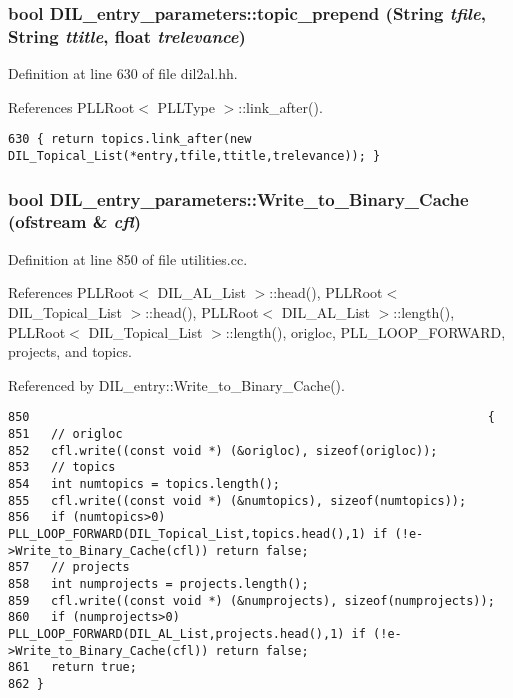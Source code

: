 \subsubsection{\setlength{\rightskip}{0pt plus 5cm}bool DIL\_\-entry\_\-parameters::topic\_\-prepend ({\bf String} {\em tfile}, {\bf String} {\em ttitle}, float {\em trelevance})\hspace{0.3cm}{\tt  [inline]}}\label{classDIL__entry__parameters_a2}




Definition at line 630 of file dil2al.hh.

References PLLRoot$<$ PLLType $>$::link\_\-after().



\footnotesize\begin{verbatim}630 { return topics.link_after(new DIL_Topical_List(*entry,tfile,ttitle,trelevance)); }
\end{verbatim}\normalsize 
{}
\subsubsection{\setlength{\rightskip}{0pt plus 5cm}bool DIL\_\-entry\_\-parameters::Write\_\-to\_\-Binary\_\-Cache (ofstream \& {\em cfl})}\label{classDIL__entry__parameters_a6}




Definition at line 850 of file utilities.cc.

References PLLRoot$<$ DIL\_\-AL\_\-List $>$::head(), PLLRoot$<$ DIL\_\-Topical\_\-List $>$::head(), PLLRoot$<$ DIL\_\-AL\_\-List $>$::length(), PLLRoot$<$ DIL\_\-Topical\_\-List $>$::length(), origloc, PLL\_\-LOOP\_\-FORWARD, projects, and topics.

Referenced by DIL\_\-entry::Write\_\-to\_\-Binary\_\-Cache().



\footnotesize\begin{verbatim}850                                                                {
851   // origloc
852   cfl.write((const void *) (&origloc), sizeof(origloc));
853   // topics
854   int numtopics = topics.length();
855   cfl.write((const void *) (&numtopics), sizeof(numtopics));
856   if (numtopics>0) PLL_LOOP_FORWARD(DIL_Topical_List,topics.head(),1) if (!e->Write_to_Binary_Cache(cfl)) return false;
857   // projects
858   int numprojects = projects.length();
859   cfl.write((const void *) (&numprojects), sizeof(numprojects));
860   if (numprojects>0) PLL_LOOP_FORWARD(DIL_AL_List,projects.head(),1) if (!e->Write_to_Binary_Cache(cfl)) return false;
861   return true;
862 }
\end{verbatim}\normalsize 


